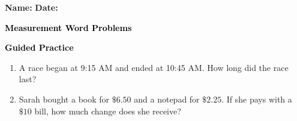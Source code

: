 \documentclass[12pt, letterpaper, fleqn]{article}
\begin{document}
\textbf{Name:} \underline{\hspace{5cm}}
\hfill
\textbf{Date:} \underline{\hspace{3cm}}\\

\begin{tcolorbox}[colback=customteal!20]
    \large\textcolor{black}{\textbf{Measurement Word Problems}}
\end{tcolorbox}
\newpage
\begin{tcolorbox}[colback=customteal!20]
    \large\textcolor{black}{\textbf{Guided Practice}}
\end{tcolorbox}
\begin{enumerate}[itemsep=3.5cm, leftmargin=0.6cm]
\item A race began at 9:15 AM and ended at 10:45 AM. How long did the race last?
\vspace{3cm}
\item Sarah bought a book for $\$6.50$ and a notepad for $\$2.25$. If she pays with a $\$10$ bill, how much change does she receive?
\end{enumerate}
\end{document}
